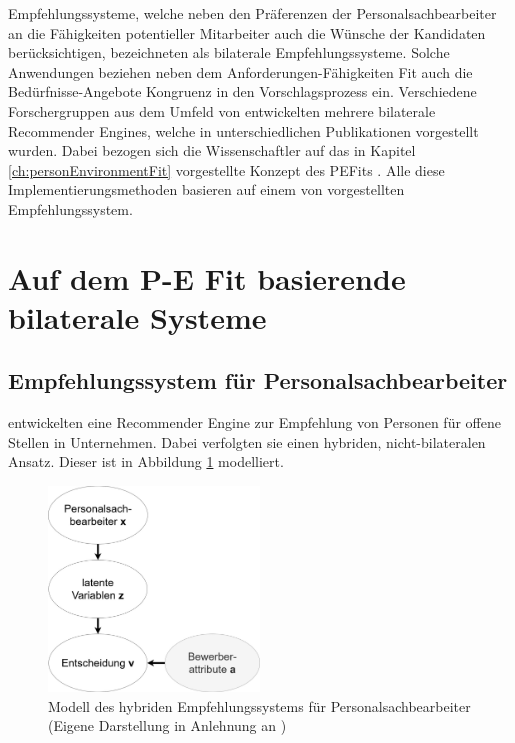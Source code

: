 Empfehlungssysteme, welche neben den Präferenzen der Personalsachbearbeiter an die Fähigkeiten potentieller Mitarbeiter auch die Wünsche der Kandidaten berücksichtigen, bezeichneten \textcite[S. 4]{malinowski:2006} als bilaterale Empfehlungssysteme. Solche Anwendungen beziehen neben dem Anforderungen-Fähigkeiten Fit auch die Bedürfnisse-Angebote Kongruenz in den Vorschlagsprozess ein. Verschiedene Forschergruppen aus dem Umfeld von \textcite[S. 1ff.]{malinowski:2006} entwickelten mehrere bilaterale Recommender Engines, welche in unterschiedlichen Publikationen vorgestellt wurden. Dabei bezogen sich die Wissenschaftler auf das in Kapitel \ref{ch:personEnvironmentFit} vorgestellte Konzept des \acp{PEFit} \cite[S. 4f.]{keim:2007}\cite[S. 3f.]{keim:2005}\cite[S. 3f.]{malinowski:2005}\cite[S. 3f.]{malinowski:2006}\cite[S. 3ff.]{malinowski:2008}. Alle diese Implementierungsmethoden basieren auf einem von \textcite[S. 1ff.]{faerber:2003} vorgestellten Empfehlungssystem.

\section{Auf dem P-E Fit basierende bilaterale Systeme}
\label{ch:verwandteArbeiten:aufDemPEFitBasierendeBilateraleSysteme}

\subsection{Empfehlungssystem für Personalsachbearbeiter}
\label{ch:verwandteArbeiten:aufDemPEFitBasierendeBilateraleSysteme:grundlegendesEmpfelungssystem}
\textcite[S. 4ff.]{faerber:2003} entwickelten eine Recommender Engine zur Empfehlung von Personen für offene Stellen in Unternehmen. Dabei verfolgten sie einen hybriden, nicht-bilateralen Ansatz. Dieser ist in Abbildung \ref{fig:verwandteArbeiten:abb1} modelliert.

\begin{figure}[h]
	\centering
	\includegraphics[width=0.5\textwidth]{gfx/faerber.jpg}
	\caption[Modell des hybriden Empfehlungssystems für Personalsachbearbeiter]{Modell des hybriden Empfehlungssystems für Personalsachbearbeiter\\
	(Eigene Darstellung in Anlehnung an \cite[S. 8]{faerber:2003})}
	\label{fig:verwandteArbeiten:abb1}
\end{figure}

